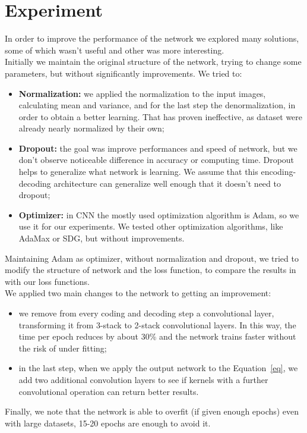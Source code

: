 \documentclass[11pt, a4paper]{article}
\begin{document}
	\section{Experiment} %
	In order to improve the performance of the network we explored many solutions, some of which wasn't useful and other was more interesting.\\
	Initially we maintain the original structure of the network, trying to change some parameters, but without significantly improvements. We tried to:
	\begin{itemize}
		\item \textbf{Normalization:} we applied the normalization to the input images, calculating mean and variance, and for the last step the denormalization, in order to obtain a better learning. That has proven ineffective, as dataset were already nearly normalized by their own;
		\item \textbf{Dropout:} the goal was improve performances and speed of network, but we don't observe noticeable difference in accuracy or computing time. Dropout helps to generalize what network is learning. We assume that this encoding-decoding architecture can generalize well enough that it doesn't need to dropout; 
		\item \textbf{Optimizer:} in CNN the mostly used optimization algorithm is Adam, so we use it for our experiments. We tested other optimization algorithms, like AdaMax or SDG, but without improvements.
	\end{itemize}
	Maintaining Adam as optimizer, without normalization and dropout, we tried to modify the structure of network and the loss function, to compare the results in \cite{mainpaper} with our loss functions.\\
	We applied two main changes to the network to getting an improvement:
	\begin{itemize}
		\item we remove from every coding and decoding step a convolutional layer, transforming it from 3-stack to 2-stack convolutional layers. In this way, the time per epoch reduces by about 30\% and the network trains faster without the risk of under fitting;
		\item in the last step, when we apply the output network to the Equation~\ref{eq}, we add two additional convolution layers to see if kernels with a further convolutional operation can return better results. 
	\end{itemize}
	Finally, we note that the network is able to overfit (if given enough epochs) even with large datasets, 15-20 epochs are enough to avoid it.
	
\end{document}

